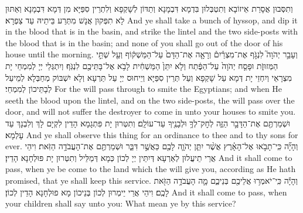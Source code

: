 {וְתִסְּבוּן אֲסָרַת אֵיזוֹבָא וְתִטְבְּלוּן בִּדְמָא דִּבְמָנָא וְתַדּוֹן לְשָׁקְפָא וְלִתְרֵין סִפַּיָּא מִן דְּמָא דִּבְמָנָא וְאַתּוּן לָא תִפְּקוּן אֲנָשׁ מִתְּרַע בֵּיתֵיהּ עַד צַפְרָא׃}
{And ye shall take a bunch of hyssop, and dip it in the blood that is in the basin, and strike the lintel and the two side-posts with the blood that is in the basin; and none of you shall go out of the door of his house until the morning.}{}
{וְעָבַ֣ר יְהֹוָה֮ לִנְגֹּ֣ף אֶת־מִצְרַ֒יִם֒ וְרָאָ֤ה אֶת־הַדָּם֙ עַל־הַמַּשְׁק֔וֹף וְעַ֖ל שְׁתֵּ֣י הַמְּזוּזֹ֑ת וּפָסַ֤ח יְהֹוָה֙ עַל־הַפֶּ֔תַח וְלֹ֤א יִתֵּן֙ הַמַּשְׁחִ֔ית לָבֹ֥א אֶל־בָּתֵּיכֶ֖ם לִנְגֹּֽף׃
}
{וְיִתְגְּלֵי יְיָ לְמִמְחֵי יָת מִצְרָאֵי וְיִחְזֵי יָת דְּמָא עַל שָׁקְפָא וְעַל תְּרֵין סִפַּיָּא וְיֵיחוּס יְיָ עַל תַּרְעָא וְלָא יִשְׁבּוֹק מְחַבְּלָא לְמֵיעַל לְבָתֵּיכוֹן לְמִמְחֵי׃}
{For the \lord\space will pass through to smite the Egyptians; and when He seeth the blood upon the lintel, and on the two side-posts, the \lord\space will pass over the door, and will not suffer the destroyer to come in unto your houses to smite you.}{}
{וּשְׁמַרְתֶּ֖ם אֶת־הַדָּבָ֣ר הַזֶּ֑ה לְחׇק־לְךָ֥ וּלְבָנֶ֖יךָ עַד־עוֹלָֽם׃}
{וְתִטְּרוּן יָת פִּתְגָמָא הָדֵין לִקְיָם לָךְ וְלִבְנָךְ עַד עָלְמָא׃}
{And ye shall observe this thing for an ordinance to thee and to thy sons for ever.}{}
{וְהָיָ֞ה כִּֽי־תָבֹ֣אוּ אֶל־הָאָ֗רֶץ אֲשֶׁ֨ר יִתֵּ֧ן יְהֹוָ֛ה לָכֶ֖ם כַּאֲשֶׁ֣ר דִּבֵּ֑ר וּשְׁמַרְתֶּ֖ם אֶת־הָעֲבֹדָ֥ה הַזֹּֽאת׃
}
{וִיהֵי אֲרֵי תֵיעֲלוּן לְאַרְעָא דְּיִתֵּין יְיָ לְכוֹן כְּמָא דְּמַלֵּיל וְתִטְּרוּן יָת פּוּלְחָנָא הָדֵין׃}
{And it shall come to pass, when ye be come to the land which the \lord\space will give you, according as He hath promised, that ye shall keep this service.}{}
{וְהָיָ֕ה כִּֽי־יֹאמְר֥וּ אֲלֵיכֶ֖ם בְּנֵיכֶ֑ם מָ֛ה הָעֲבֹדָ֥ה הַזֹּ֖את לָכֶֽם׃}
{וִיהֵי אֲרֵי יֵימְרוּן לְכוֹן בְּנֵיכוֹן מָא פוּלְחָנָא הָדֵין לְכוֹן׃}
{And it shall come to pass, when your children shall say unto you: What mean ye by this service?}{}
